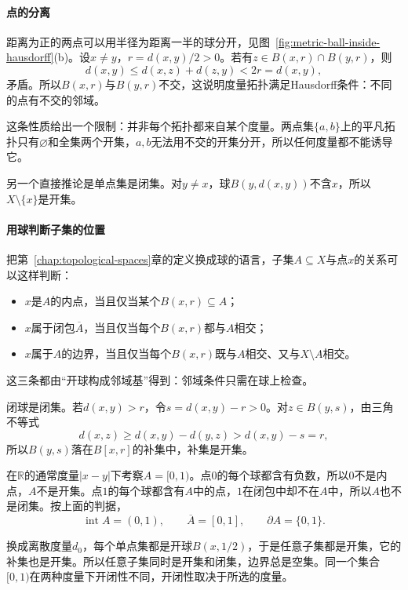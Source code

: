 \paragraph{点的分离}
距离为正的两点可以用半径为距离一半的球分开，见图~\ref{fig:metric-ball-inside-hausdorff}(b)。设$x\neq y$，$r=d(x,y)/2>0$。若有$z\in B(x,r)\cap B(y,r)$，则
\[
d(x,y)\leq d(x,z)+d(z,y)<2r=d(x,y),
\]
矛盾。所以$B(x,r)$与$B(y,r)$不交，这说明度量拓扑满足Hausdorff条件：不同的点有不交的邻域。

这条性质给出一个限制：并非每个拓扑都来自某个度量。两点集$\{a,b\}$上的平凡拓扑只有$\varnothing$和全集两个开集，$a,b$无法用不交的开集分开，所以任何度量都不能诱导它。

另一个直接推论是单点集是闭集。对$y\neq x$，球$B(y,d(x,y))$不含$x$，所以$X\setminus\{x\}$是开集。

\paragraph{用球判断子集的位置}
把第~\ref{chap:topological-spaces}章的定义换成球的语言，子集$A\subseteq X$与点$x$的关系可以这样判断：
\begin{itemize}
\item $x$是$A$的内点，当且仅当某个$B(x,r)\subseteq A$；
\item $x$属于闭包$\overline A$，当且仅当每个$B(x,r)$都与$A$相交；
\item $x$属于$A$的边界，当且仅当每个$B(x,r)$既与$A$相交、又与$X\setminus A$相交。
\end{itemize}
这三条都由“开球构成邻域基”得到：邻域条件只需在球上检查。

闭球是闭集。若$d(x,y)>r$，令$s=d(x,y)-r>0$。对$z\in B(y,s)$，由三角不等式
\[
d(x,z)\geq d(x,y)-d(y,z)>d(x,y)-s=r,
\]
所以$B(y,s)$落在$B[x,r]$的补集中，补集是开集。

\begin{example}[开闭性与边界的判断]
\label{ex:metric-open-closed-interval}
在$\mathbb R$的通常度量$\lvert x-y\rvert$下考察$A=[0,1)$。点$0$的每个球都含有负数，所以$0$不是内点，$A$不是开集。点$1$的每个球都含有$A$中的点，$1$在闭包中却不在$A$中，所以$A$也不是闭集。按上面的判据，
\[
\operatorname{int}A=(0,1),\qquad\overline A=[0,1],\qquad\partial A=\{0,1\}.
\]

换成离散度量$d_0$，每个单点集都是开球$B(x,1/2)$，于是任意子集都是开集，它的补集也是开集。所以任意子集同时是开集和闭集，边界总是空集。同一个集合$[0,1)$在两种度量下开闭性不同，开闭性取决于所选的度量。
\end{example}


